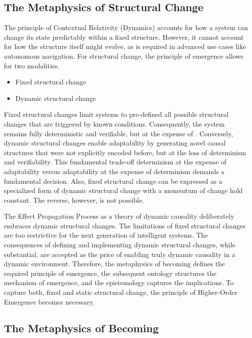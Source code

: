 \newpage

\subsection{The Metaphysics of Structural Change} 
\label{sec:metaphysics_becoming}

The principle of Contextual Relativity (Dynamics) accounts for how a system can change its state predictably within a fixed structure. 
However, it cannot account for how the structure itself might evolve, as is required in advanced use cases like autonomous navigation. 
For structural change, the principle of emergence allows for two modalities.

\begin{itemize}
	\item Fixed structural change
	\item Dynamic structural change
\end{itemize}

Fixed structural changes limit systems to pre-defined all possible structural changes that are triggered by known conditions.
Consequently, the system remains fully deterministic and verifiable, but at the expense of . 
Conversely, dynamic structural changes enable adaptability by  generating novel causal structures that were not explicitly encoded before,
but at the loss of determinism and verifiability. This fundamental trade-off determinism at the expense of adaptability versus
adaptability at the expense of  determinism demands a fundamental decision. Also, fixed structural change can be expressed 
as a specialized form of dynamic structural change with a momentum of change hold constant. The reverse, however, is not possible. 

The Effect Propagation Process as a theory of dynamic causality deliberately embraces dynamic structural changes.
The limitations of fixed structural changes are too restrictive for the next generation of intelligent systems.
The consequences of defining and implementing dynamic structural changes, while substantial, 
are accepted as the price of enabling truly dynamic causality in a dynamic environment. 
Therefore, the metaphysics of becoming defines the required principle of emergence, 
the subsequent ontology structures the mechanism of emergence, and the epistemology captures 
the implications. To capture both, fixed and static structural change, the principle of Higher-Order Emergence  becomes necessary. 


\subsection{The Metaphysics of Becoming} 
\label{sec:metaphysics_becoming}

